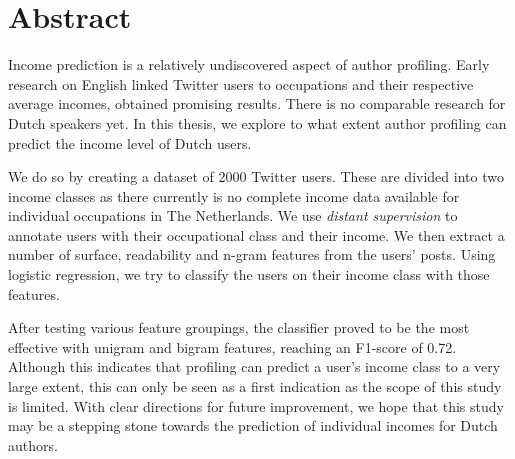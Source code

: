 \documentclass[
10pt, %
a4paper, %
oneside, %
headinclude,footinclude, %
] {book}%
\begin{document}

\chapter*{Abstract}
Income prediction is a relatively undiscovered aspect of author profiling. Early research on English \citep{flekova} linked Twitter users to occupations and their respective average incomes, obtained promising results. There is no comparable research for Dutch speakers yet. In this thesis, we explore to what extent author profiling can predict the income level of Dutch users.

We do so by creating a dataset of 2000 Twitter users. These are divided into two income classes as there currently is no complete income data available for individual occupations in The Netherlands. We use \textit{distant supervision} to annotate users with their occupational class and their income. We then extract a number of surface, readability and n-gram features from the users' posts. Using logistic regression, we try to classify the users on their income class with those features.

After testing various feature groupings, the classifier proved to be the most effective with unigram and bigram features, reaching an F1-score of 0.72. Although this indicates that  profiling can predict a user's income class to a very large extent, this can only be seen as a first indication as the scope of this study is limited. With clear directions for future improvement, we hope that this study may be a stepping stone towards the prediction of individual incomes for Dutch authors.

\clearpage
\setcounter{tocdepth}{3} %
\tableofcontents %


\end{document}
